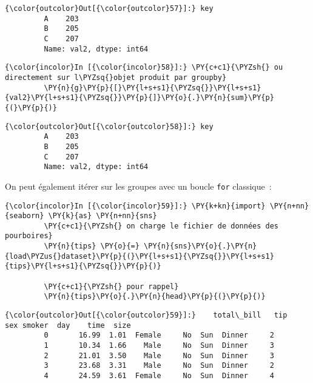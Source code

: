 \begin{Verbatim}[commandchars=\\\{\},frame=single,framerule=0.3mm,rulecolor=\color{cellframecolor}]
{\color{outcolor}Out[{\color{outcolor}57}]:} key
         A    203
         B    205
         C    207
         Name: val2, dtype: int64
\end{Verbatim}
            
    \begin{Verbatim}[commandchars=\\\{\},frame=single,framerule=0.3mm,rulecolor=\color{cellframecolor}]
{\color{incolor}In [{\color{incolor}58}]:} \PY{c+c1}{\PYZsh{} ou directement sur l\PYZsq{}objet produit par groupby}
         \PY{n}{g}\PY{p}{[}\PY{l+s+s1}{\PYZsq{}}\PY{l+s+s1}{val2}\PY{l+s+s1}{\PYZsq{}}\PY{p}{]}\PY{o}{.}\PY{n}{sum}\PY{p}{(}\PY{p}{)}
\end{Verbatim}


\begin{Verbatim}[commandchars=\\\{\},frame=single,framerule=0.3mm,rulecolor=\color{cellframecolor}]
{\color{outcolor}Out[{\color{outcolor}58}]:} key
         A    203
         B    205
         C    207
         Name: val2, dtype: int64
\end{Verbatim}
            
    On peut également itérer sur les groupes avec un boucle \texttt{for}
classique~:

    \begin{Verbatim}[commandchars=\\\{\},frame=single,framerule=0.3mm,rulecolor=\color{cellframecolor}]
{\color{incolor}In [{\color{incolor}59}]:} \PY{k+kn}{import} \PY{n+nn}{seaborn} \PY{k}{as} \PY{n+nn}{sns}
         \PY{c+c1}{\PYZsh{} on charge le fichier de données des pourboires}
         \PY{n}{tips} \PY{o}{=} \PY{n}{sns}\PY{o}{.}\PY{n}{load\PYZus{}dataset}\PY{p}{(}\PY{l+s+s1}{\PYZsq{}}\PY{l+s+s1}{tips}\PY{l+s+s1}{\PYZsq{}}\PY{p}{)}
         
         \PY{c+c1}{\PYZsh{} pour rappel}
         \PY{n}{tips}\PY{o}{.}\PY{n}{head}\PY{p}{(}\PY{p}{)}
\end{Verbatim}


\begin{Verbatim}[commandchars=\\\{\},frame=single,framerule=0.3mm,rulecolor=\color{cellframecolor}]
{\color{outcolor}Out[{\color{outcolor}59}]:}    total\_bill   tip     sex smoker  day    time  size
         0       16.99  1.01  Female     No  Sun  Dinner     2
         1       10.34  1.66    Male     No  Sun  Dinner     3
         2       21.01  3.50    Male     No  Sun  Dinner     3
         3       23.68  3.31    Male     No  Sun  Dinner     2
         4       24.59  3.61  Female     No  Sun  Dinner     4
\end{Verbatim}
            
